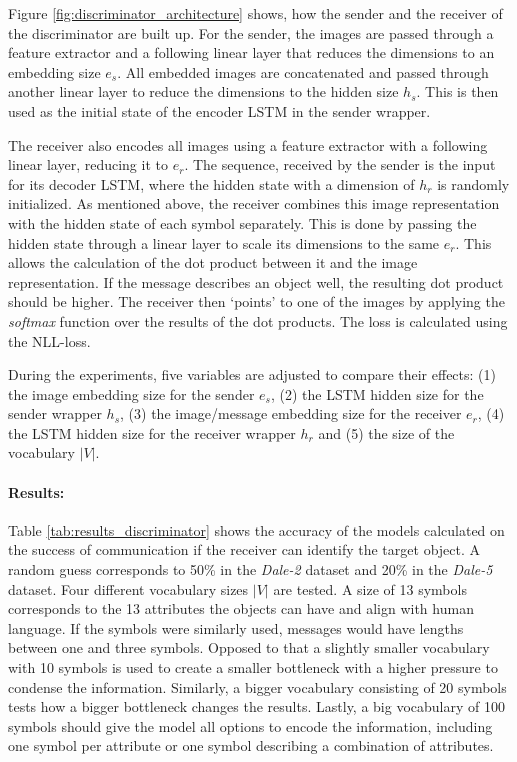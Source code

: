 Figure \ref{fig:discriminator_architecture} shows, how the sender and the receiver of the discriminator are built up.
For the sender, the images are passed through a feature extractor and a following linear layer that reduces the dimensions to an embedding size $e_s$.
All embedded images are concatenated and passed through another linear layer to reduce the dimensions to the hidden size $h_s$.
This is then used as the initial state of the encoder LSTM in the sender wrapper.

The receiver also encodes all images using a feature extractor with a following linear layer, reducing it to $e_r$.
The sequence, received by the sender is the input for its decoder LSTM, where the hidden state with a dimension of $h_r$ is randomly initialized.
As mentioned above, the receiver combines this image representation with the hidden state of each symbol separately.
This is done by passing the hidden state through a linear layer to scale its dimensions to the same $e_r$.
This allows the calculation of the dot product between it and the image representation.
If the message describes an object well, the resulting dot product should be higher.
The receiver then `points' to one of the images by applying the \emph{softmax} function over the results of the dot products.
The loss is calculated using the NLL-loss.

During the experiments, five variables are adjusted to compare their effects:
(1) the image embedding size for the sender $e_s$, (2) the LSTM hidden size for the sender wrapper $h_s$, (3) the image/message embedding size for the receiver $e_r$, (4) the LSTM hidden size for the receiver wrapper $h_r$ and (5) the size of the vocabulary $|V|$.

\paragraph*{Results:}
Table \ref{tab:results_discriminator} shows the accuracy of the models calculated on the success of communication if the receiver can identify the target object.
A random guess corresponds to 50\% in the \emph{Dale-2} dataset and 20\% in the \emph{Dale-5} dataset.
Four different vocabulary sizes $|V|$ are tested.
A size of 13 symbols corresponds to the 13 attributes the objects can have and align with human language.
If the symbols were similarly used, messages would have lengths between one and three symbols.
Opposed to that a slightly smaller vocabulary with 10 symbols is used to create a smaller bottleneck with a higher pressure to condense the information.
Similarly, a bigger vocabulary consisting of 20 symbols tests how a bigger bottleneck changes the results.
Lastly, a big vocabulary of 100 symbols should give the model all options to encode the information, including one symbol per attribute or one symbol describing a combination of attributes.

